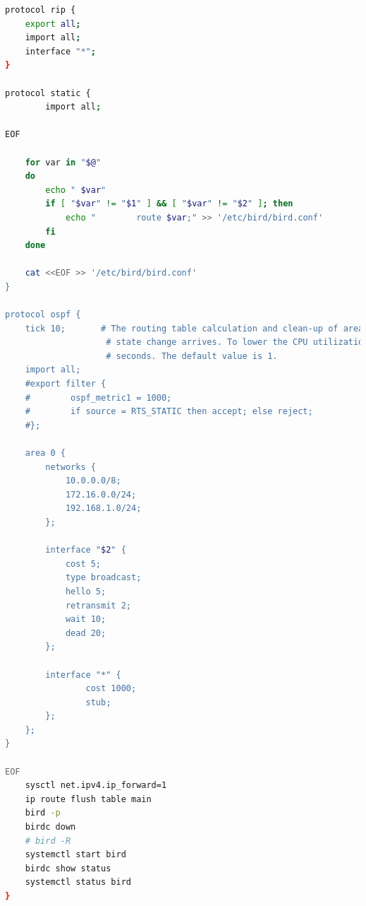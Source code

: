 \documentclass[11pt,titlepage]{article}
\begin{document}
\begin{lstlisting}[language=bash,caption={~/doConfig.sh}]
protocol rip {
    export all;
    import all;
    interface "*";
}

protocol static {
        import all;

EOF
    
    for var in "$@"
    do
        echo " $var"
        if [ "$var" != "$1" ] && [ "$var" != "$2" ]; then
            echo "        route $var;" >> '/etc/bird/bird.conf'
        fi
    done
    
    cat <<EOF >> '/etc/bird/bird.conf'
}

protocol ospf {
    tick 10;       # The routing table calculation and clean-up of areas' databases is not performed when a single link
                    # state change arrives. To lower the CPU utilization, it's processed later at periodical intervals of num
                    # seconds. The default value is 1.
    import all;
    #export filter {
    #        ospf_metric1 = 1000;
    #        if source = RTS_STATIC then accept; else reject;
    #};

    area 0 {
        networks {
            10.0.0.0/8;
            172.16.0.0/24;
            192.168.1.0/24;
        };
        
        interface "$2" {
            cost 5;
            type broadcast;
            hello 5; 
            retransmit 2; 
            wait 10; 
            dead 20;
        };

        interface "*" {
                cost 1000;
                stub;
        };
    };
}

EOF
    sysctl net.ipv4.ip_forward=1
    ip route flush table main
    bird -p
    birdc down
    # bird -R
    systemctl start bird
    birdc show status
    systemctl status bird
}


\end{lstlisting}
\end{document}
